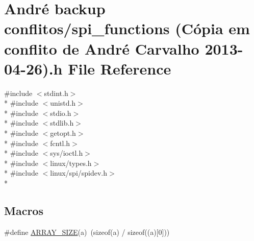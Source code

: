 \hypertarget{spi__functions_01_07C_xC3_xB3pia_01em_01conflito_01de_01Andr_xC3_xA9_01Carvalho_012013-04-26_08_8h}{\section{André backup conflitos/spi\-\_\-functions (Cópia em conflito de André Carvalho 2013-\/04-\/26).h File Reference}
\label{spi__functions_01_07C_xC3_xB3pia_01em_01conflito_01de_01Andr_xC3_xA9_01Carvalho_012013-04-26_08_8h}
}
{\ttfamily \#include $<$stdint.\-h$>$}\\*
{\ttfamily \#include $<$unistd.\-h$>$}\\*
{\ttfamily \#include $<$stdio.\-h$>$}\\*
{\ttfamily \#include $<$stdlib.\-h$>$}\\*
{\ttfamily \#include $<$getopt.\-h$>$}\\*
{\ttfamily \#include $<$fcntl.\-h$>$}\\*
{\ttfamily \#include $<$sys/ioctl.\-h$>$}\\*
{\ttfamily \#include $<$linux/types.\-h$>$}\\*
{\ttfamily \#include $<$linux/spi/spidev.\-h$>$}\\*
\subsection*{Macros}
\begin{DoxyCompactItemize}
\item 
\#define \hyperlink{spi__functions_01_07C_xC3_xB3pia_01em_01conflito_01de_01Andr_xC3_xA9_01Carvalho_012013-04-26_08_8h_a25f003de16c08a4888b69f619d70f427}{A\-R\-R\-A\-Y\-\_\-\-S\-I\-Z\-E}(a)~(sizeof(a) / sizeof((a)\mbox{[}0\mbox{]}))
\end{DoxyCompactItemize}
